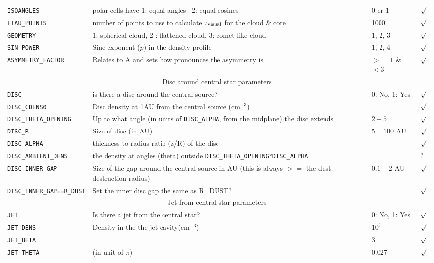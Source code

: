 \documentclass[12pt,a4paper]{article}
\begin{document}
{\begin{tabular}{|p{4.4cm}|p{10.1cm}|p{2.3cm}|p{0.3cm}|}
\texttt{ISOANGLES} & polar cells have 1: equal angles \ 2: equal cosines & 0 or 1 & $\surd$\\
\texttt{FTAU\_POINTS} & number of points to use to calculate $\tau_{\rm visual}$ for the cloud \& core & 1000 & $\surd$\\
\texttt{GEOMETRY} & 1: spherical cloud, 2 : flattened cloud, 3: comet-like cloud & 1, 2, 3& $\surd$\\
\texttt{SIN\_POWER} &  Sine exponent ($p$) in the density profile & 1, 2, 4& $\surd$\\
\texttt{ASYMMETRY\_FACTOR} & Relates to A and sets how pronounces the asymmetry is& $ >=1$ \& $<3$ & $\surd$\\
\hline
\multicolumn{4}{|c|}{Disc around  central star parameters}\\
\hline
\texttt{DISC} & is there a disc around the central source? & 0: No, 1: Yes & $\surd$\\
\texttt{DISC\_CDENS0} &  Disc density at 1AU from the central source (cm$^{-3}$)& & $\surd$\\
\texttt{DISC\_THETA\_OPENING} & Up to what angle (in units of \texttt{DISC\_ALPHA}, from the midplane) the disc extends & $2-5$  & $\surd$ \\
\texttt{DISC\_R} &  Size of disc (in AU) & $5-100$ AU& $\surd$\\
\texttt{DISC\_ALPHA} &  thickness-to-radius ratio (z/R) of the disc & & $\surd$\\
\texttt{DISC\_AMBIENT\_DENS} &  the density at angles (theta) outside  \texttt{DISC\_THETA\_OPENING*DISC\_ALPHA} & & ?\\
\texttt{DISC\_INNER\_GAP} &  Size of the gap around the central source in AU (this is always $>=$ the dust destruction radius) & $0.1-2$ AU& $\surd$\\
\texttt{DISC\_INNER\_GAP==R\_DUST} & Set the inner disc gap the same as R\_DUST?  & & $\surd$\\
\hline
\multicolumn{4}{|c|}{Jet from  central star parameters}\\
\hline
\texttt{JET} & Is there a jet from the central star? & 0: No, 1: Yes&$\surd$\\
\texttt{JET\_DENS} & Density in the the jet cavity(cm$^{-3}$)& $10^3$ &$\surd$\\
\texttt{JET\_BETA} & & $3$ &$\surd$\\
\texttt{JET\_THETA} & (in unit of $\pi$) & 0.027 &$\surd$\\
\hline
\end{tabular}
\par}
\end{document}
